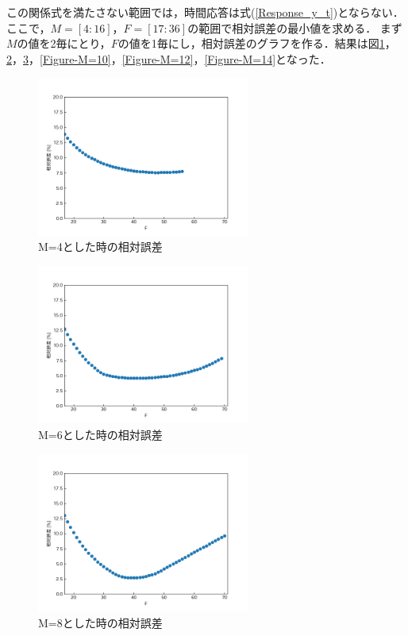 \documentclass[12pt]{jsarticle}
\begin{document}
この関係式を満たさない範囲では，時間応答は式(\ref{Response_y_t})とならない．
ここで，$M=[4:16]$，$F=[17:36]$の範囲で相対誤差の最小値を求める．
まず$M$の値を2毎にとり，$F$の値を1毎にし，相対誤差のグラフを作る．結果は図\ref{Figure-M=4}，\ref{Figure-M=6}，\ref{Figure-M=8}，\ref{Figure-M=10}，\ref{Figure-M=12}，\ref{Figure-M=14}となった．
\begin{figure}[tb]
  \begin{center}
    \includegraphics[clip,width=7.0cm]{../img/M=4.png}
    \caption{M=4とした時の相対誤差}
    \label{Figure-M=4}
  \end{center}
\end{figure}
\begin{figure}[tb]
  \begin{center}
    \includegraphics[clip,width=7.0cm]{../img/M=6.png}
    \caption{M=6とした時の相対誤差}
    \label{Figure-M=6}
  \end{center}
\end{figure}
\begin{figure}[tb]
  \begin{center}
    \includegraphics[clip,width=7.0cm]{../img/M=8.png}
    \caption{M=8とした時の相対誤差}
    \label{Figure-M=8}
  \end{center}
\end{figure}
\end{document}
